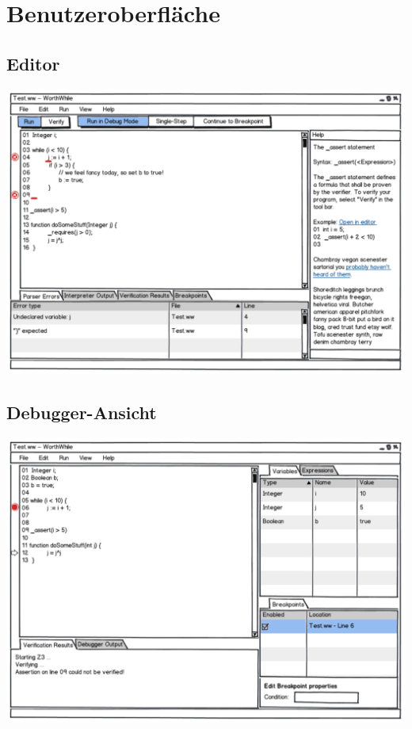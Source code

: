 \section{Benutzeroberfläche}%

\subsection{Editor}%

\includegraphics[width=\textwidth]{mockup/editor.pdf}

\subsection{Debugger-Ansicht}%

\includegraphics[width=\textwidth]{mockup/debug.pdf}
